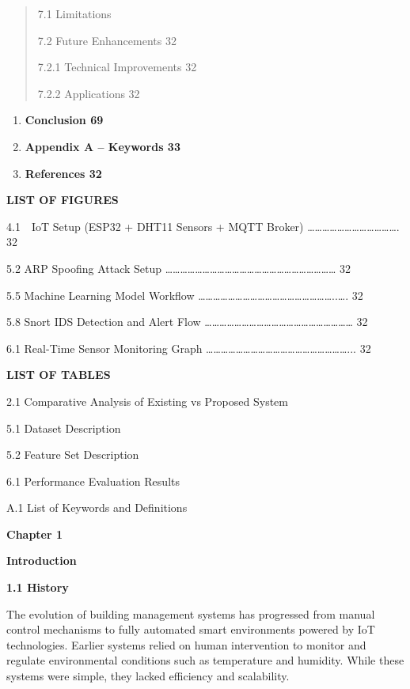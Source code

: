 \begin{quote}
7.1 Limitations

7.2 Future Enhancements 32

7.2.1 Technical Improvements 32

7.2.2 Applications 32
\end{quote}

\begin{enumerate}
\def\labelenumi{\arabic{enumi}.}
\setcounter{enumi}{7}
\item
  \textbf{Conclusion 69}
\item
  \textbf{Appendix A -- Keywords 33}
\item
  \textbf{References 32}
\end{enumerate}

\textbf{LIST OF FIGURES}

4.1 IoT Setup (ESP32 + DHT11 Sensors + MQTT Broker)
\ldots\ldots\ldots\ldots\ldots\ldots\ldots\ldots\ldots\ldots\ldots\ldots.
32

5.2 ARP Spoofing Attack Setup
\ldots\ldots\ldots\ldots\ldots\ldots\ldots\ldots\ldots\ldots\ldots\ldots\ldots\ldots\ldots\ldots\ldots\ldots\ldots\ldots\ldots\ldots\ldots{}
32

5.5 Machine Learning Model Workflow
\ldots\ldots\ldots\ldots\ldots\ldots\ldots\ldots\ldots\ldots\ldots\ldots\ldots\ldots\ldots\ldots\ldots\ldots..\ldots.
32

5.8 Snort IDS Detection and Alert Flow
\ldots\ldots\ldots\ldots\ldots\ldots\ldots\ldots\ldots\ldots\ldots\ldots\ldots\ldots\ldots\ldots\ldots\ldots\ldots\ldots{}
32

6.1 Real-Time Sensor Monitoring Graph
\ldots\ldots\ldots\ldots\ldots\ldots\ldots\ldots\ldots\ldots\ldots\ldots\ldots\ldots\ldots\ldots\ldots\ldots\ldots...
32

\textbf{LIST OF TABLES}

2.1 Comparative Analysis of Existing vs Proposed System

5.1 Dataset Description

5.2 Feature Set Description

6.1 Performance Evaluation Results

A.1 List of Keywords and Definitions

\textbf{Chapter 1}

\textbf{Introduction}

\textbf{1.1 History}

The evolution of building management systems has progressed from manual
control mechanisms to fully automated smart environments powered by IoT
technologies. Earlier systems relied on human intervention to monitor
and regulate environmental conditions such as temperature and humidity.
While these systems were simple, they lacked efficiency and scalability.

